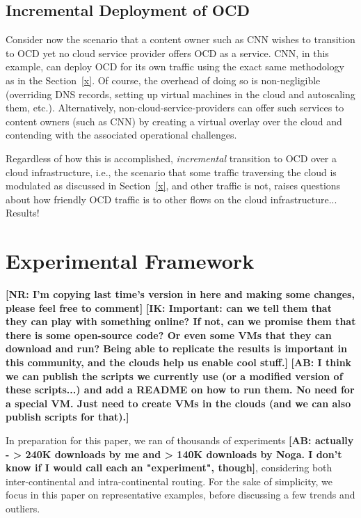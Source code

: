\documentclass[sigconf,usenames,dvipsnames,geometry]{acmart}
\newcommand{\mycomm}[3]{{\color{#2} \textbf{[#1: #3]}}}
\newcommand{\mycomm}[3]{}
\newcommand{\IK}[1]{\mycomm{IK}{blue}{#1}}
\newcommand{\AB}[1]{\mycomm{AB}{Orange}{#1}}
\newcommand{\NR}[1]{\mycomm{NR}{OliveGreen}{#1}}
\begin{document}
\subsection{Incremental Deployment of OCD}

Consider now the scenario that a content owner such as CNN wishes to transition to OCD yet no cloud service provider offers OCD as a service. CNN, in this example, can deploy OCD for its own traffic using the exact same methodology as in the Section~\ref{x}. Of course, the overhead of doing so is non-negligible (overriding DNS records, setting up virtual machines in the cloud and autoscaling them, etc.). Alternatively, non-cloud-service-providers can offer such services to content owners (such as CNN) by creating a virtual overlay over the cloud and contending with the associated operational challenges.

Regardless of how this is accomplished, \emph{incremental} transition to OCD over a cloud infrastructure, i.e., the scenario that some traffic traversing the cloud is modulated as discussed in Section~\ref{x}, and other traffic is not, raises questions about how friendly OCD traffic is to other flows on the cloud infrastructure... Results!


\section{Experimental Framework}

\NR{I'm copying last time's version in here and making some changes, please feel free to comment}
\IK{Important: can we tell them that they can play with something online? If not, can we promise them that there is some open-source code? Or even some VMs that they can download and run? Being able to replicate the results is important in this community, and the clouds help us  enable cool stuff.}
\AB{I think we can publish the scripts we currently use (or a modified version of these scripts...) and add a README on how to run them. No need for a special VM. Just need to create VMs in the clouds (and we can also publish scripts for that).}

In preparation for this paper, we ran of thousands of experiments \AB{actually - > 240K downloads by me and > 140K downloads by Noga. I don't know if I would call each an "experiment", though}, considering both inter-continental and intra-continental routing. For the sake of simplicity, we focus in this paper on representative examples, before discussing a few trends and outliers.
\end{document}
